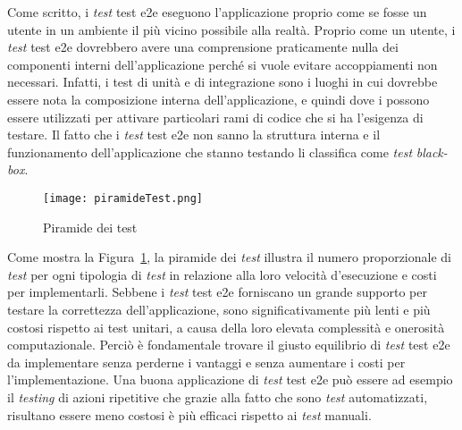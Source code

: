 Come scritto, i \emph{test} \gls{test e2e} eseguono l'applicazione proprio come se fosse un utente in un ambiente il più vicino possibile alla realtà. Proprio come un utente, i \emph{test} \gls{test e2e} dovrebbero avere una comprensione praticamente nulla dei componenti interni dell'applicazione perché si vuole evitare accoppiamenti non necessari. Infatti, i test di unità e di integrazione sono i luoghi in cui dovrebbe essere nota la composizione interna dell'applicazione, e quindi dove i  possono essere utilizzati per attivare particolari rami di codice che si ha l'esigenza di testare. Il fatto che i \emph{test} \gls{test e2e} non sanno la struttura interna e il funzionamento dell'applicazione che stanno testando li classifica come \emph{test} \emph{black-box}.
\clearpage

\begin{figure}[!h] 
	\begin{center}
		\texttt{[image: piramideTest.png]}
		\caption{Piramide dei test}\label{fig:test}
	\end{center}
\end{figure}

Come mostra la Figura~\ref{fig:test}, la piramide dei \emph{test} illustra il numero proporzionale di \emph{test} per ogni tipologia di \emph{test} in relazione alla loro velocità d'esecuzione e costi per implementarli. Sebbene i \emph{test} \gls{test e2e} forniscano un grande supporto per testare la correttezza dell'applicazione, sono significativamente più lenti e più costosi rispetto ai test unitari, a causa della loro elevata complessità e onerosità computazionale. Perciò è fondamentale trovare il giusto equilibrio di \emph{test} \gls{test e2e} da implementare senza perderne i vantaggi e senza aumentare i costi per l'implementazione. Una buona applicazione di \emph{test} \gls{test e2e} può essere ad esempio il \emph{testing} di azioni ripetitive che grazie alla fatto che sono \emph{test} automatizzati, risultano essere meno costosi è più efficaci rispetto ai \emph{test} manuali.

